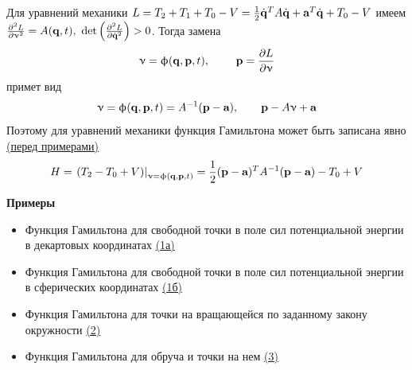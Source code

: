 \documentclass[specialist, subf, href, colorlinks=true, 12pt, times, mtpro, final]{disser}
\theoremstyle{definition}
\def\bfphi{\upphi}
\def\bfnu{\upnu}
\begin{document}
     	Для уравнений механики $L = T_2 + T_1 + T_0 - V = \frac{1}{2}\dot{\mathbf{q}}^T A \dot{\mathbf{q}} + \textbf{a}^T \dot{\mathbf{q}} + T_0 - V$ имеем $\frac{\partial^2 L}{\partial \bfnu^2} = A(\bfq, t), \ \det \left(\frac{\partial^2 L}{\partial \dot{\bfq}^2}\right) > 0$. Тогда замена 
     	$$
     		\bfnu = \bfphi (\bfq, \bfp, t), \ \ \ \ \ \ \ \bfp = \frac{\partial L}{\partial \bfnu}
     	$$
     	примет вид 
     	$$
     	\bfnu = \bfphi (\bfq, \bfp, t) = A^{-1} (\bfp - \textbf{a}), \ \ \ \ \ \ \bfp - A \bfnu + \textbf{a}
     	$$
     	Поэтому для уравнений механики функция Гамильтона может быть записана явно \hyperlink {lects.16}{(перед примерами)}
     	$$
     		H = \left. (T_2 - T_0 + V) \right|_{\bfnu = \bfphi (\bfq, \bfp, t)} = \frac{1}{2}(\bfp - \textbf{a})^T A^{-1} (\bfp - \textbf{a}) - T_0 + V
     	$$
     	
     	\textbf{Примеры}
     	\begin{itemize}
     		\item Функция Гамильтона для свободной точки в поле сил потенциальной энергии в декартовых координатах \hyperlink {lects.16}{(1а)}
     		\item Функция Гамильтона для свободной точки в поле сил потенциальной энергии в сферических координатах \hyperlink {lects.16}{(1б)}
     		\item Функция Гамильтона для точки на вращающейся по заданному закону окружности \hyperlink {lects.16}{(2)}
     		\item Функция Гамильтона для обруча и точки на нем \hyperlink {lects.16}{(3)}
     	\end{itemize}
     	
\end{document}
